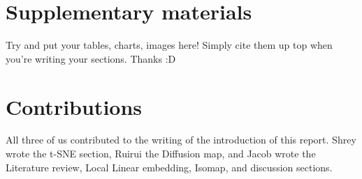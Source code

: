 \documentclass[11pt]{article}
\begin{document}
\section{Supplementary materials}

Try and put your tables, charts, images here! Simply cite them up top when you're writing your sections. Thanks :D

\section{Contributions}

\hspace{5mm}All three of us contributed to the writing of the introduction of this report. Shrey wrote the t-SNE section, Ruirui the Diffusion map, and Jacob wrote the Literature review, Local Linear embedding, Isomap, and discussion sections. 
\end{document}
